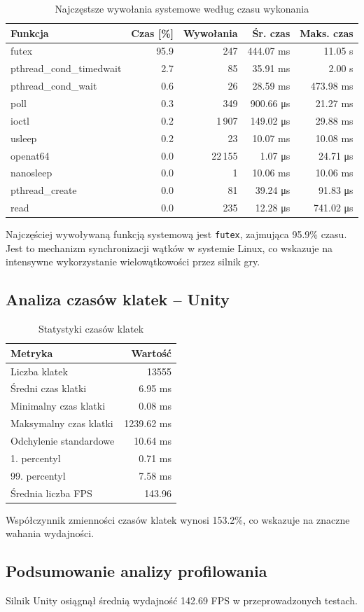 \begin{table}[htbp]
\centering
\caption{Najczęstsze wywołania systemowe według czasu wykonania}
\label{tab:osrt-time-unity-full-95s}
\begin{tabular}{|l|r|r|r|r|}
\hline
\textbf{Funkcja} & \textbf{Czas [\%]} & \textbf{Wywołania} & \textbf{Śr. czas} & \textbf{Maks. czas} \\
\hline
futex & 95.9 & 247 & 444.07 ms & 11.05 s \\
pthread\_cond\_timedwait & 2.7 & 85 & 35.91 ms & 2.00 s \\
pthread\_cond\_wait & 0.6 & 26 & 28.59 ms & 473.98 ms \\
poll & 0.3 & 349 & 900.66 μs & 21.27 ms \\
ioctl & 0.2 & 1\,907 & 149.02 μs & 29.88 ms \\
usleep & 0.2 & 23 & 10.07 ms & 10.08 ms \\
openat64 & 0.0 & 22\,155 & 1.07 μs & 24.71 μs \\
nanosleep & 0.0 & 1 & 10.06 ms & 10.06 ms \\
pthread\_create & 0.0 & 81 & 39.24 μs & 91.83 μs \\
read & 0.0 & 235 & 12.28 μs & 741.02 μs \\
\hline
\end{tabular}
\end{table}

Najczęściej wywoływaną funkcją systemową jest
\texttt{futex}, zajmująca
95.9\% czasu.
Jest to mechanizm synchronizacji wątków w systemie Linux,
co wskazuje na intensywne wykorzystanie wielowątkowości
przez silnik gry.

\subsection{Analiza czasów klatek -- Unity}
\label{subsec:frametime-unity-full-95s}

\begin{table}[htbp]
\centering
\caption{Statystyki czasów klatek}
\label{tab:frametime-stats-unity-full-95s}
\begin{tabular}{|l|r|}
\hline
\textbf{Metryka} & \textbf{Wartość} \\
\hline
Liczba klatek & 13555 \\
Średni czas klatki & 6.95 ms \\
Minimalny czas klatki & 0.08 ms \\
Maksymalny czas klatki & 1239.62 ms \\
Odchylenie standardowe & 10.64 ms \\
1. percentyl & 0.71 ms \\
99. percentyl & 7.58 ms \\
Średnia liczba FPS & 143.96 \\
\hline
\end{tabular}
\end{table}

Współczynnik zmienności czasów klatek wynosi 153.2\%,
co wskazuje na znaczne wahania wydajności.

\subsection{Podsumowanie analizy profilowania}
\label{subsec:nsight-wnioski}

Silnik Unity osiągnął średnią wydajność 142.69 FPS
w przeprowadzonych testach.

